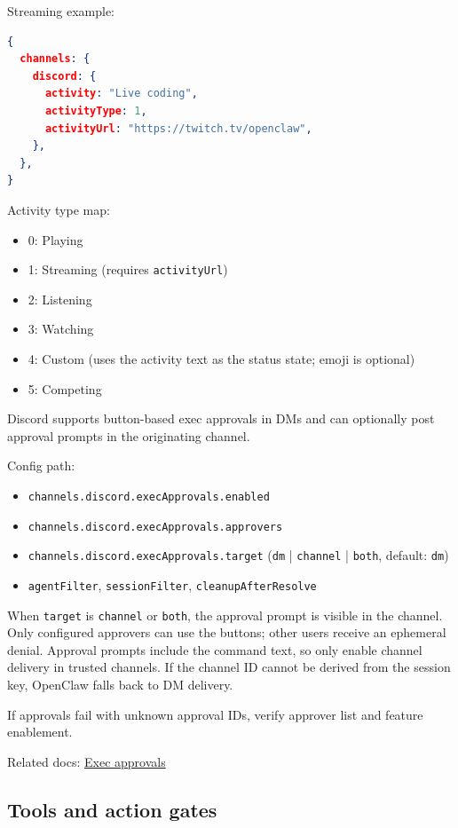 Streaming example:

\begin{lstlisting}[language=json]
{
  channels: {
    discord: {
      activity: "Live coding",
      activityType: 1,
      activityUrl: "https://twitch.tv/openclaw",
    },
  },
}
\end{lstlisting}


Activity type map:

\begin{itemize}
  \item 0: Playing
  \item 1: Streaming (requires \texttt{activityUrl})
  \item 2: Listening
  \item 3: Watching
  \item 4: Custom (uses the activity text as the status state; emoji is optional)
  \item 5: Competing
\end{itemize}



Discord supports button-based exec approvals in DMs and can optionally post approval prompts in the originating channel.

Config path:

\begin{itemize}
  \item \texttt{channels.discord.execApprovals.enabled}
  \item \texttt{channels.discord.execApprovals.approvers}
  \item \texttt{channels.discord.execApprovals.target} (\texttt{dm} | \texttt{channel} | \texttt{both}, default: \texttt{dm})
  \item \texttt{agentFilter}, \texttt{sessionFilter}, \texttt{cleanupAfterResolve}
\end{itemize}


When \texttt{target} is \texttt{channel} or \texttt{both}, the approval prompt is visible in the channel. Only configured approvers can use the buttons; other users receive an ephemeral denial. Approval prompts include the command text, so only enable channel delivery in trusted channels. If the channel ID cannot be derived from the session key, OpenClaw falls back to DM delivery.

If approvals fail with unknown approval IDs, verify approver list and feature enablement.

Related docs: \href{/tools/exec-approvals}{Exec approvals}


\subsection{Tools and action gates}


